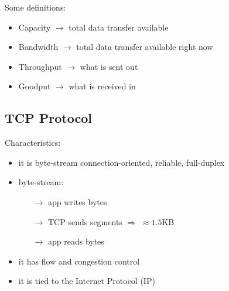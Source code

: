 Some definitions:
\begin{itemize}
    \item Capacity $\rightarrow$ total data transfer available
    \item Bandwidth $\rightarrow$ total data transfer available right now
    \item Throughput $\rightarrow$ what is sent out
    \item Goodput $\rightarrow$ what is received in
\end{itemize}

\subsection{TCP Protocol}
Characteristics:
\begin{itemize}
    \item it is byte-stream connection-oriented, reliable, full-duplex
    \item byte-stream:
    \begin{itemize}
        \item[$\rightarrow$] app writes bytes
        \item[$\rightarrow$] TCP sends segments $\Rightarrow$ $\approx 1.5$KB
        \item[$\rightarrow$] app reads bytes
    \end{itemize}
    \item it has flow and congestion control
    \item it is tied to the Internet Protocol (IP)
\end{itemize}

